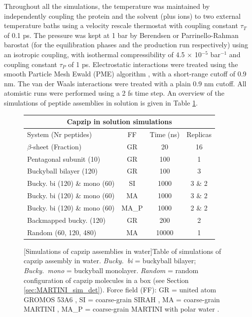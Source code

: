 Throughout all the simulations, the temperature was maintained by independently coupling the protein and the solvent (plus ions) to two external temperature baths using a velocity rescale thermostat \citep{Bussi2007} with coupling constant $\tau _T$ of 0.1 ps. The pressure was kept at 1 bar by Berendsen \citep{Berendsen1984} or Parrinello-Rahman barostat \citep{Parrinello1981} (for the equilibration phases and the production run respectively) using an isotropic coupling, with isothermal compressibility of 4.5 $\times$ 10$^{-5}$ bar$^{-1}$ and coupling constant $\tau_P$ of 1 ps. Electrostatic interactions were treated using the smooth Particle Mesh Ewald (PME) algorithm \citep{Essmann1995}, with a short-range cutoff of 0.9 nm. The van der Waals interactions were treated with a plain 0.9 nm cutoff. All atomistic runs were performed using a 2 fs time step. An overview of the simulations of peptide assemblies in solution is given in Table \ref{table:sim_solution}.

\begin{figure}[t]
\centering
 \def\arraystretch{1.6}
\begin{tabular}{l|ccc}
 \multicolumn{4}{c}{\textbf{Capzip in solution simulations}} \\
 \hline
 System (Nr peptides) & FF & Time (ns) & Replicas \\
 \hline
 $\beta$-sheet (Fraction) & GR & 20 & 16 \\
 Pentagonal subunit (10) & GR & 100 & 1 \\
 Buckyball bilayer (120) & GR & 100 & 3 \\
 Bucky. bi (120) \& mono (60) & SI & 1000 & 3 \& 2 \\
 Bucky. bi (120) \& mono (60) & MA & 1000 & 3 \& 2 \\
 Bucky. bi (120) \& mono (60) & MA\_P & 1000 & 2 \& 2 \\
 Backmapped bucky. (120) & GR & 200 & 2 \\
 Random (60, 120, 480) & MA & 10000 & 1 \\
 \hline
 \end{tabular}
[Simulations of capzip assemblies in water]{Table of simulations of capzip assembly in water. \emph{Bucky.\ bi} = buckyball bilayer; \emph{Bucky.\ mono} = buckyball monolayer. \emph{Random} = random configuration of capzip molecules in a box (see Section \ref{sec:MARTINI_sim_det}). Force field (FF): GR = united atom GROMOS 53A6 \citep{Oostenbrink2004}, SI = coarse-grain SIRAH \citep{Machado2018}, MA = coarse-grain MARTINI \citep{Marrink2007, Monticelli2008}, MA\_P = coarse-grain MARTINI with polar water \citep{Yesylevskyy2010}.}
\label{table:sim_solution}
\end{figure}

